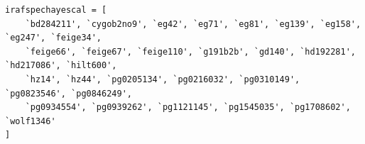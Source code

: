 \documentclass[twocolumn, linenumbers]{aastex631}
\begin{document}
\begin{verbatim}
irafspechayescal = [
    `bd284211', `cygob2no9', `eg42', `eg71', `eg81', `eg139', `eg158', `eg247', `feige34',
    `feige66', `feige67', `feige110', `g191b2b', `gd140', `hd192281', `hd217086', `hilt600',
    `hz14', `hz44', `pg0205134', `pg0216032', `pg0310149', `pg0823546', `pg0846249',
    `pg0934554', `pg0939262', `pg1121145', `pg1545035', `pg1708602', `wolf1346'
]
\end{verbatim}



{}



\end{document}
